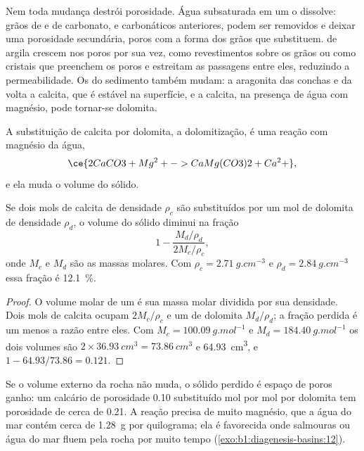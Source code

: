 Nem toda mudança destrói porosidade. Água subsaturada em um  o dissolve: grãos de
 e de carbonato, e  carbonáticos anteriores, podem ser removidos e deixar
uma porosidade secundária, poros com a forma dos grãos que substituem.  de argila
crescem nos poros por sua vez, como revestimentos sobre os grãos ou como cristais que
preenchem os poros e estreitam as passagens entre eles, reduzindo a permeabilidade. Os
 do sedimento também mudam: a aragonita das conchas e da  volta
a calcita, que é estável na superfície, e a calcita, na presença de água com magnésio, pode
tornar-se dolomita.

A substituição de calcita por dolomita, a dolomitização, é uma reação com magnésio da água,
\[
  \ce{2 CaCO3 + Mg^2+ -> CaMg(CO3)2 + Ca^2+},
\]
e ela muda o volume do sólido.

\begin{proposition}\label{prop:b1:diagenesis-basins:dolomite}
Se dois mols de calcita de densidade $\rho_c$ são substituídos por um mol de dolomita de
densidade $\rho_d$, o volume do sólido diminui na fração
\[
  1 - \frac{M_d/\rho_d}{2M_c/\rho_c},
\]
onde $M_c$ e $M_d$ são as massas molares. Com $\rho_c = \qty{2.71}{g.cm^{-3}}$ e
$\rho_d = \qty{2.84}{g.cm^{-3}}$ essa fração é \qty{12.1}{\percent}.
\end{proposition}

\begin{proof}
O volume molar de um  é sua massa molar dividida por sua densidade. Dois mols de
calcita ocupam $2M_c/\rho_c$ e um de dolomita $M_d/\rho_d$; a fração perdida é um menos a
razão entre eles. Com $M_c = \qty{100.09}{g.mol^{-1}}$ e $M_d = \qty{184.40}{g.mol^{-1}}$ os
dois volumes são $2\times\qty{36.93}{cm^3} = \qty{73.86}{cm^3}$ e \qty{64.93}{cm^3}, e
$1 - 64.93/73.86 = \num{0.121}$.
\end{proof}

Se o volume externo da rocha não muda, o sólido perdido é espaço de poros ganho: um calcário
de porosidade \num{0.10} substituído mol por mol por dolomita tem porosidade de cerca de
\num{0.21}. A reação precisa de muito magnésio, que a água do mar contém cerca de
\qty{1.28}{g} por quilograma; ela é favorecida onde salmouras ou água do mar fluem pela rocha
por muito tempo (\cref{exo:b1:diagenesis-basins:12}).

